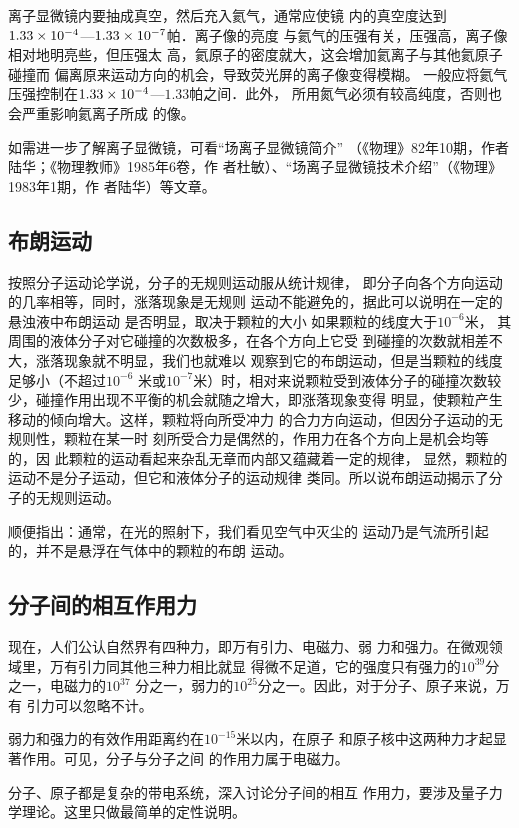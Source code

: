 离子显微镜内要抽成真空，然后充入氦气，通常应使镜
内的真空度达到$1.33\times10^{-4}$—$1.33\times10^{-7}$帕．离子像的亮度
与氦气的压强有关，压强高，离子像相对地明亮些，但压强太
高，氦原子的密度就大，这会增加氦离子与其他氦原子碰撞而
偏离原来运动方向的机会，导致荧光屏的离子像变得模糊。
一般应将氦气压强控制在$1.33\times10^{-4}$—$1.33$帕之间．此外，
所用氮气必须有较高纯度，否则也会严重影响氦离子所成
的像。

如需进一步了解离子显微镜，可看“场离子显微镜简介”
（《物理》82年10期，作者陆华；《物理教师》1985年6卷，作
者杜敏）、“场离子显微镜技术介绍”（《物理》1983年1期，作
者陆华）等文章。

\subsection{布朗运动}
按照分子运动论学说，分子的无规则运动服从统计规律，
即分子向各个方向运动的几率相等，同时，涨落现象是无规则
运动不能避免的，据此可以说明在一定的悬浊液中布朗运动
是否明显，取决于颗粒的大小 如果颗粒的线度大于$10^{-6}$米，
其周围的液体分子对它碰撞的次数极多，在各个方向上它受
到碰撞的次数就相差不大，涨落现象就不明显，我们也就难以
观察到它的布朗运动，但是当颗粒的线度足够小（不超过$10^{-6}$
米或$10^{-7}$米）时，相对来说颗粒受到液体分子的碰撞次数较
少，碰撞作用出现不平衡的机会就随之增大，即涨落现象变得
明显，使颗粒产生移动的倾向增大。这样，颗粒将向所受冲力
的合力方向运动，但因分子运动的无规则性，颗粒在某一时
刻所受合力是偶然的，作用力在各个方向上是机会均等的，因
此颗粒的运动看起来杂乱无章而内部又蕴藏着一定的规律，
显然，颗粒的运动不是分子运动，但它和液体分子的运动规律
类同。所以说布朗运动揭示了分子的无规则运动。

顺便指出：通常，在光的照射下，我们看见空气中灭尘的
运动乃是气流所引起的，并不是悬浮在气体中的颗粒的布朗
运动。

\subsection{分子间的相互作用力}
现在，人们公认自然界有四种力，即万有引力、电磁力、弱
力和强力。在微观领域里，万有引力同其他三种力相比就显
得微不足道，它的强度只有强力的$10^{39}$分之一，电磁力的$10^{37}$
分之一，弱力的$10^{25}$分之一。因此，对于分子、原子来说，万有
引力可以忽略不计。

弱力和强力的有效作用距离约在$10^{-15}$米以内，在原子
和原子核中这两种力才起显著作用。可见，分子与分子之间
的作用力属于电磁力。

分子、原子都是复杂的带电系统，深入讨论分子间的相互
作用力，要涉及量子力学理论。这里只做最简单的定性说明。

